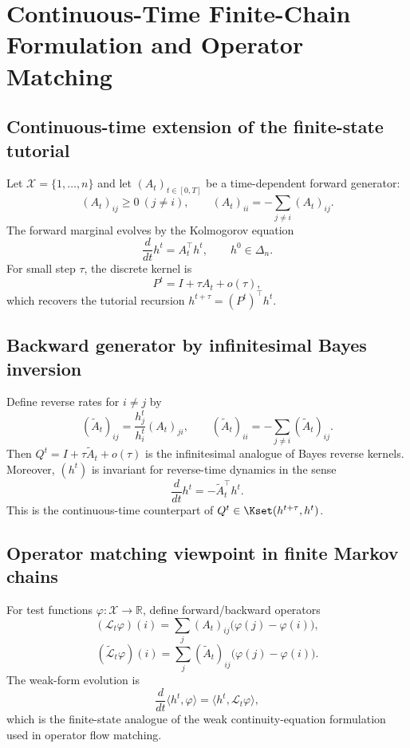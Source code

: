 \section{Continuous-Time Finite-Chain Formulation and Operator Matching}
\subsection{Continuous-time extension of the finite-state tutorial}
Let $\mathcal X=\{1,\dots,n\}$ and let $(A_t)_{t\in[0,T]}$ be a time-dependent forward generator:
\[
(A_t)_{ij}\ge 0\ (j\neq i),\qquad
(A_t)_{ii}=-\sum_{j\neq i}(A_t)_{ij}.
\]
The forward marginal evolves by the Kolmogorov equation
\[
\frac{d}{dt}h^t=A_t^\top h^t,\qquad h^0\in\Delta_n.
\]
For small step $\tau$, the discrete kernel is
\[
P^t=I+\tau A_t+o(\tau),
\]
which recovers the tutorial recursion $h^{t+\tau}=(P^t)^\top h^t$.

\subsection{Backward generator by infinitesimal Bayes inversion}
Define reverse rates for $i\neq j$ by
\[
(\widetilde A_t)_{ij}
=\frac{h_j^t}{h_i^t}(A_t)_{ji},
\qquad
(\widetilde A_t)_{ii}=-\sum_{j\neq i}(\widetilde A_t)_{ij}.
\]
Then $Q^t=I+\tau \widetilde A_t+o(\tau)$ is the infinitesimal analogue of Bayes reverse kernels.
Moreover, $(h^t)$ is invariant for reverse-time dynamics in the sense
\[
\frac{d}{dt}h^t=-\widetilde A_t^\top h^t.
\]
This is the continuous-time counterpart of $Q^t\in\Kset(h^{t+\tau},h^t)$.

\subsection{Operator matching viewpoint in finite Markov chains}
For test functions $\varphi:\mathcal X\to\mathbb R$, define forward/backward operators
\[
(\mathcal L_t\varphi)(i)=\sum_j (A_t)_{ij}\big(\varphi(j)-\varphi(i)\big),
\]
\[
(\widetilde{\mathcal L}_t\varphi)(i)=\sum_j (\widetilde A_t)_{ij}\big(\varphi(j)-\varphi(i)\big).
\]
The weak-form evolution is
\[
\frac{d}{dt}\langle h^t,\varphi\rangle=\langle h^t,\mathcal L_t\varphi\rangle,
\]
which is the finite-state analogue of the weak continuity-equation formulation used in operator flow matching.

